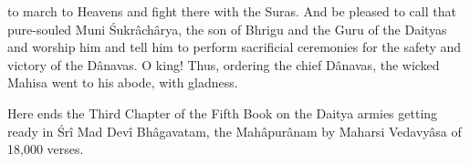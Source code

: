 to march to Heavens and fight there with the Suras. And be pleased to call that pure-souled Muni \'Sukr\^ach\^arya, the son of Bhrigu and the Guru of the Daityas and worship him and tell him to perform sacrificial ceremonies for the safety and victory of the D\^anavas. O king! Thus, ordering the chief D\^anavas, the wicked Mahisa went to his abode, with gladness.

Here ends the Third Chapter of the Fifth Book on the Daitya armies getting ready in \'Sr\^i Mad Dev\^i Bh\^agavatam, the Mah\^apur\^anam by Maharsi Vedavy\^asa of 18,000 verses.